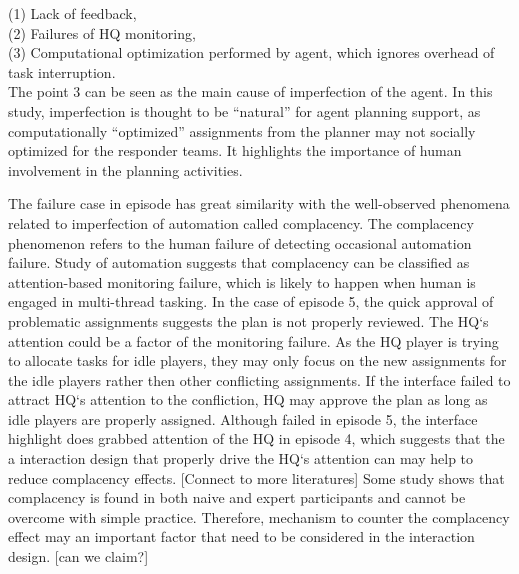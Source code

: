 (1) Lack of feedback, \\
(2) Failures of HQ monitoring, \\
(3) Computational optimization performed by agent, which ignores overhead of task interruption. \\

The point 3 can be seen as the main cause of imperfection of the agent. In this study, imperfection is thought to be ``natural'' for agent planning support, as computationally ``optimized'' assignments from the planner may not socially optimized for the responder teams. It highlights the importance of human involvement in the planning activities. 

The failure case in episode has great similarity with the well-observed phenomena related to imperfection of automation called complacency. The complacency phenomenon refers to the human failure of detecting occasional automation failure. Study of automation suggests that complacency can be classified as attention-based monitoring failure, which is likely to happen when human is engaged in multi-thread tasking. In the case of episode 5, the quick approval of problematic assignments suggests the plan is not properly reviewed. The HQ`s attention could be a factor of the monitoring failure. As the HQ player is trying to allocate tasks for idle players, they may only focus on the new assignments for the idle players rather then other conflicting assignments.  If the interface failed to attract HQ`s attention to the confliction, HQ may approve the plan as long as idle players are properly assigned. Although failed in episode 5, the interface highlight does grabbed attention of the HQ in episode 4, which suggests that the a interaction design that properly drive the HQ`s attention can may help to reduce complacency effects.  [Connect to more literatures] Some study shows that complacency is found in both naive and expert participants and cannot be overcome with simple practice. Therefore, mechanism to counter the complacency effect may an important factor that need to be considered in the interaction design. [can we claim?]


